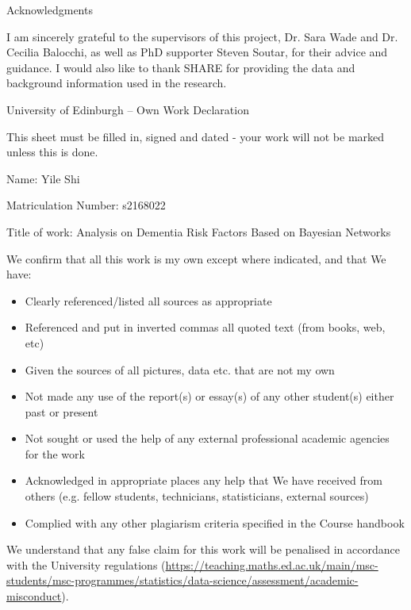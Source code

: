 \documentclass[11pt,twoside]{article}
\numberwithin{Theorem}{section}
\numberwithin{Definition}{section}
\numberwithin{Lemma}{section}
\numberwithin{Algorithm}{section}
\numberwithin{equation}{section}
\begin{document}
\clearpage

\begin{center}
\Large{Acknowledgments}
\end{center}

I am sincerely grateful to the supervisors of this project, Dr. Sara Wade and Dr. Cecilia Balocchi, as well as PhD supporter Steven Soutar, for their advice and guidance. I would also like to thank SHARE for providing the data and background information used in the research. 


\clearpage


\begin{center}
\Large{University of Edinburgh – Own Work Declaration}
\end{center}

This sheet must be filled in, signed and dated - your work will not be marked unless this is done.
\vspace{1cm}

Name: Yile Shi

Matriculation Number: s2168022

Title of work: Analysis on Dementia Risk Factors Based on Bayesian Networks

\vspace{1cm}

We confirm that all this work is my own except where indicated, and that We have:
\begin{itemize}
\item	Clearly referenced/listed all sources as appropriate	 				
\item	Referenced and put in inverted commas all quoted text (from books, web, etc)	
\item	Given the sources of all pictures, data etc. that are not my own				
\item	Not made any use of the report(s) or essay(s) of any other student(s) either past 	
or present	
\item	Not sought or used the help of any external professional academic agencies for the work
\item	Acknowledged in appropriate places any help that We have received from others	(e.g. fellow students, technicians, statisticians, external sources)
\item	Complied with any other plagiarism criteria specified in the Course handbook
\end{itemize}

We understand that any false claim for this work will be penalised in accordance with
the University regulations	(\url{https://teaching.maths.ed.ac.uk/main/msc-students/msc-programmes/statistics/data-science/assessment/academic-misconduct}).								
\end{document}
